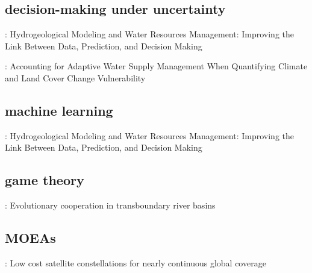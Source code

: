\documentclass[11pt]{article}
\begin{document}
\subsection{decision-making under uncertainty} 
\noindent\citep{Harken2019}:   Hydrogeological Modeling and Water Resources Management: Improving the Link Between Data, Prediction, and Decision Making
\medskip

\noindent\citep{Gorelick2020}:   Accounting for Adaptive Water Supply Management When Quantifying Climate and Land Cover Change Vulnerability
\medskip



\subsection{machine learning} 
\noindent\citep{Harken2019}:   Hydrogeological Modeling and Water Resources Management: Improving the Link Between Data, Prediction, and Decision Making
\medskip



\subsection{game theory} 
\noindent\citep{Yu2019}:   Evolutionary cooperation in transboundary river basins
\medskip



\subsection{MOEAs} 
\noindent\citep{Singh2020}:   Low cost satellite constellations for nearly continuous global coverage
\medskip




 
\end{document}
